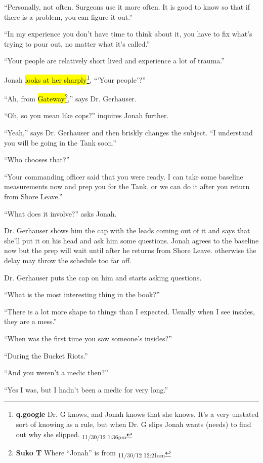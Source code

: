 ``Personally, not often.  Surgeons use it more often.  It is good to know so that if there is a problem, you can figure it out.''

``In my experience you don't have time to think about it, you have to fix what's trying to pour out, no matter what it's called.''

``Your people are relatively short lived and experience a lot of trauma.''

Jonah \hl{looks at her sharply}\footnote{\textbf{q.google }Dr. G knows, and Jonah knows that she knows.  It's a very unstated sort of knowing as a rule, but when Dr. G slips Jonah wants (needs) to find out why she slipped. \textsubscript{11/30/12 1:36pm}}, ``'Your people'?''

``Ah, from \hl{Gateway}\footnote{\textbf{Suko T }Where ``Jonah'' is from \textsubscript{11/30/12 12:21am}},'' says Dr. Gerhauser.

``Oh, so you mean like cops?'' inquires Jonah further.

``Yeah,'' says Dr. Gerhauser and then briskly changes the subject.  ``I understand you will be going in the Tank soon.''

``Who chooses that?''

``Your commanding officer said that you were ready.  I can take some baseline measurements now and prep you for the Tank, or we can do it after you return from Shore Leave.''

``What does it involve?'' asks Jonah.

Dr. Gerhauser shows him the cap with the leads coming out of it and says that she'll put it on his head and ask him some questions.  Jonah agrees to the baseline now but the prep will wait until after he returns from Shore Leave.  otherwise the delay may throw the schedule too far off.



Dr. Gerhauser puts the cap on him and starts asking questions.

``What is the most interesting thing in the book?''

``There is a lot more shape to things than I expected.  Usually when I see insides, they are a mess.''

``When was the first time you saw someone's insides?''

``During the Bucket Riots.''

``And you weren't a medic then?''

``Yes I was, but I hadn't been a medic for very long.''

